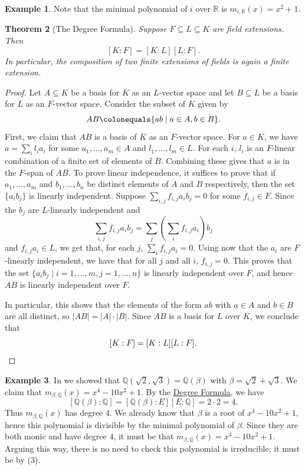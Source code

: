\documentclass[12pt]{report}
\newtheorem{theorem}{Theorem}[chapter]
\numberwithin{equation}{section}
\numberwithin{theorem}{chapter}
\theoremstyle{definition}
\newtheorem{example}[theorem]{Example}
\newtheorem*{basic properties}{Basic Properties}
\newtheorem*{Important Remark}{Important Remark}
\newcommand{\R}{\mathbb{R}}
\newcommand{\Q}{\mathbb{Q}}
\begin{document}
\begin{example}
Note that the minimal polynomial of $i$ over $\R$ is $m_{i,\R}(x) = x^2 + 1$.
\end{example}



\begin{theorem}[The Degree Formula]\label{deg formula}
Suppose $F \subseteq L \subseteq K$ are field extensions. Then
$$[K:F] = [K:L] [L:F].$$
In particular, the composition of two finite extensions of fields is again a finite extension.
\end{theorem}



\begin{proof}
Let $A \subseteq K$ be a basis for $K$ as an $L$-vector space and let $B \subseteq L$ be a basis for $L$ as an $F$-vector space. Consider the subset of $K$ given by 
$$AB \colonequals \{ab \mid a \in A, b \in B\}.$$ 
First, we claim that $AB$ is a basis of $K$ as an $F$-vector space. For $a \in K$, we have $a = \sum_i l_i a_i$ for some $a_1, \dots, a_m \in A$ and $l_1, \dots, l_m \in L$. For each $i$, $l_i$ is an $F$-linear combination of a finite set of elements of $B$. Combining these gives that $a$ is in the $F$-span of $AB$. To prove linear independence, it suffices to prove that if $a_1, \dots, a_m$ and $b_1, \dots, b_n$ be distinct elements of $A$ and $B$ respectively, then the set $\{a_ib_j\}$ is linearly independent.
Suppose $\sum_{i,j} f_{i,j} a_i b_j = 0$ for some $f_{i,j} \in F$. Since the $b_j$ are $L$-linearly independent and
$$\sum_{i,j} f_{i,j} a_i b_j = \sum_j \left(\sum_i f_{i,j} a_i \right) b_j$$
and $f_{i,j} a_i \in L$, we get that, for each $j$, $\sum_i f_{i,j} a_i = 0$. Using now that the $a_i$ are $F$-linearly independent, we have that for all $j$ and all $i$, $f_{i,j} = 0$. This proves that the set $\{a_i b_j \mid i = 1, \ldots, m, j = 1, \ldots, n\}$ is linearly independent over $F$, and hence $AB$ is linearly independent over $F$.


In particular, this shows that the elements of the form $ab$ with $a \in A$ and $b \in B$ are all distinct, so $|AB| = |A| \cdot |B|$. Since $AB$ is a basis for $L$ over $K$, we conclude that
$$[K:F] = [K:L] [L:F].\qedhere$$
\end{proof}






\begin{example}\label{example degree root 2 + 3}
In  we showed that $\Q(\sqrt{2},\sqrt{3}) = \Q(\beta)$ with $\beta = \sqrt{2} + \sqrt{3}$. We claim that $m_{\beta, \Q}(x)=x^4-10x^2+1$. By the \hyperref[deg formula]{Degree Formula}, we have 
$$[\Q(\beta):\Q] = [\Q(\beta):E][E:\Q] = 2\cdot 2= 4.$$
Thus $m_{\beta, \Q}(x)$ has degree $4$. We already know that $\beta$ is a root of $x^4 - 10 x^2 + 1$, hence this polynomial is divisible by the minimal polynomial of $\beta$. Since they are both monic and have degree $4$, it must be that $m_{\beta,\Q}(x)=x^4 - 10 x^2 + 1$. Arguing this way, there is no need to check this polynomial is irreducible; it must be by  (3).
\end{example}
\end{document}
